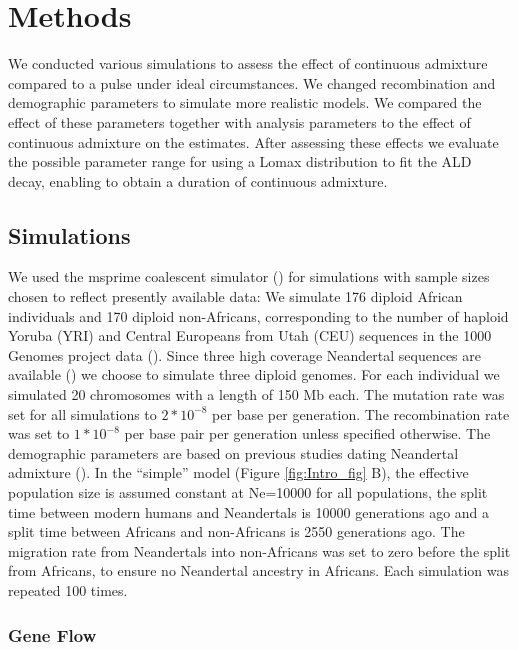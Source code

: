 \documentclass[]{article}
\begin{document}
\section{Methods}\label{methods}

We conducted various simulations to assess the effect of continuous
admixture compared to a pulse under ideal circumstances. We changed
recombination and demographic parameters to simulate more realistic
models. We compared the effect of these parameters together with
analysis parameters to the effect of continuous admixture on the
estimates. After assessing these effects we evaluate the possible
parameter range for using a Lomax distribution to fit the ALD decay,
enabling to obtain a duration of continuous admixture.

\subsection{Simulations}\label{simulations}

We used the msprime coalescent simulator
(\cite{kelleher_efficient_2016}) for simulations with sample sizes
chosen to reflect presently available data: We simulate 176 diploid
African individuals and 170 diploid non-Africans, corresponding to the
number of haploid Yoruba (YRI) and Central Europeans from Utah (CEU)
sequences in the 1000 Genomes project data
(\cite{the_1000_genomes_project_consortium_global_2015}). Since three
high coverage Neandertal sequences are available
(\cite{prufer_complete_2013,prufer_high-coverage_2017}) we choose to
simulate three diploid genomes. For each individual we simulated 20
chromosomes with a length of 150 Mb each. The mutation rate was set for
all simulations to \(2*10^{-8}\) per base per generation. The
recombination rate was set to \(1*10^{-8}\) per base pair per generation
unless specified otherwise. The demographic parameters are based on
previous studies dating Neandertal admixture
(\cite{sankararaman_date_2012,fu_genome_2014,moorjani_genetic_2016}). In
the ``simple'' model (Figure \ref{fig:Intro_fig} B), the effective
population size is assumed constant at Ne=10000 for all populations, the
split time between modern humans and Neandertals is 10000 generations
ago and a split time between Africans and non-Africans is 2550
generations ago. The migration rate from Neandertals into non-Africans
was set to zero before the split from Africans, to ensure no Neandertal
ancestry in Africans. Each simulation was repeated 100 times.

\subsubsection{Gene Flow}\label{gene flow}
\end{document}
